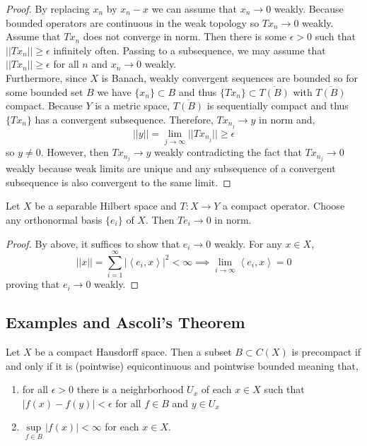\documentclass[12pt]{article}
\newcommand{\inner}[2]{\left< #1, #2 \right>}
\begin{document}
\begin{proof}
By replacing $x_n$ by $x_n - x$ we can assume that $x_n \to 0$ weakly. Because bounded operators are continuous in the weak topology so $T x_n \to 0$ weakly. Assume that $T x_n$ does not converge in norm. Then there is some $\epsilon > 0$ such that $|| T x_n || \ge \epsilon$ infinitely often. Passing to a subsequence, we may assume that $|| T x_n || \ge \epsilon$ for all $n$ and $x_n \to 0$ weakly. 
\bigskip\\
Furthermore, since $X$ is Banach, weakly convergent sequences are bounded so for some bounded set $B$ we have $\{ x_n \} \subset B$ and thus $\{ T x_n \} \subset \overline{T(B)}$ with $\overline{T(B)}$ compact. Because $Y$ is a metric space, $\overline{T(B)}$ is sequentially compact and thus $\{ T x_n \}$ has a convergent subsequence. Therefore, $T x_{n_j} \to y$ in norm and,
\[ || y || = \lim_{j \to \infty} || T x_{n_j} || \ge \epsilon \]
so $y \neq 0$. However, then $T x_{n_j} \to y$ weakly contradicting the fact that $T x_{n_j} \to 0$ weakly because weak limits are unique and any subsequence of a convergent subsequence is also convergent to the same limit.
\end{proof}

\begin{cor}
Let $X$ be a separable Hilbert space and $T : X \to Y$ a compact operator. Choose any orthonormal basis $\{ e_i \}$ of $X$. Then $T e_i \to 0$ in norm.
\end{cor}

\begin{proof}
By above, it suffices to show that $e_i \to 0$ weakly. For any $x \in X$,
\[ || x || = \sum_{i = 1}^\infty | \inner{e_i}{x} |^2 < \infty \implies \lim_{i \to \infty} \inner{e_i}{x} = 0 \]
proving that $e_i \to 0$ weakly.
\end{proof}

\subsection{Examples and Ascoli's Theorem}

\begin{thm}[Ascoli]
Let $X$ be a compact Hausdorff space. Then a subset $B \subset C(X)$ is precompact if and only if it is (pointwise) equicontinuous and pointwise bounded meaning that,
\begin{enumerate}
\item for all $\epsilon > 0$ there is a neighrborhood $U_x$ of each $x \in X$ such that $| f(x) - f(y) | < \epsilon$ for all $f \in B$ and $y \in U_x$
\item $\sup\limits_{f \in B} |f(x)| < \infty$ for each $x \in X$.
\end{enumerate}
\end{thm}
\end{document}
